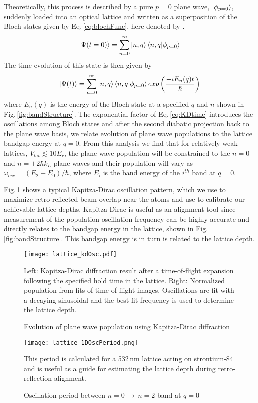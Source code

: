 Theoretically, this process is described by a pure $p=0$ plane wave, $\left| {\phi_{p=0}} \right>$, suddenly loaded into an optical lattice and written as a superposition of the Bloch states given by Eq.\,\ref{eq:blochFunc}, here denoted by .
	\begin{equation} \label{eq:p0inBloch}
		\left| {\Psi(t=0)} \right> = \sum_{n=0}^{\infty} \left| {n,q} \right> \left< {n,q} | {\phi_{p=0}} \right>
	\end{equation}
The time evolution of this state is then given by
	\begin{equation} \label{eq:KDtime}
		\left| {\Psi(t)} \right> = \sum_{n=0}^{\infty} \left| {n,q} \right> \left< {n,q} | {\phi_{p=0}} \right> exp \left( \frac{-i E_n(q) t}{\hbar} \right)
	\end{equation}
where $E_n(q)$ is the energy of the Bloch state at a specified $q$ and $n$ shown in Fig.\,\ref{fig:bandStructure}.
The exponential factor of Eq.\,\ref{eq:KDtime} introduces the oscillations among Bloch states and after the second diabatic projection back to the plane wave basis, we relate evolution of plane wave populations to the lattice bandgap energy at $q=0$.
From this analysis we find that for relatively weak lattices, $V_{lat} \lesssim 10 E_r$, the plane wave population will be constrained to the $n=0$ and $n = \pm 2 \hbar k_L$ plane waves and their population will vary as $\omega_{osc} = (E_2 - E_0) / \hbar$, where $E_i$ is the band energy of the $i^{th}$ band at $q=0$.

Fig.\,\ref{fig:KDoscillations} shows a typical Kapitza-Dirac oscillation pattern, which we use to maximize retro-reflected beam overlap near the atoms and use to calibrate our achievable lattice depths. 
Kapitza-Dirac is useful as an alignment tool since measurement of the population oscillation frequency can be highly accurate and directly relates to the bandgap energy in the lattice, shown in Fig.\,\ref{fig:bandStructure}.
This bandgap energy is in turn is related to the lattice depth.
	\begin{figure}
		\texttt{[image: lattice\_kdOsc.pdf]}
		\caption{Evolution of plane wave population using Kapitza-Dirac diffraction}{Left: Kapitza-Dirac diffraction result after a time-of-flight expansion following the specified hold time in the lattice. Right: Normalized population from fits of time-of-flight images. Oscillations are fit with a decaying sinusoidal and the best-fit frequency is used to determine the lattice depth.}
		 \label{fig:KDoscillations}
	\end{figure}
	
	\begin{figure}
		\centerline{
		\texttt{[image: lattice\_1DOscPeriod.png]}}
		\caption{Oscillation period between $n=0\,\rightarrow\,n=2$ band at $q=0$}{This period is calculated for a 532\,nm lattice acting on strontium-84 and is useful as a guide for estimating the lattice depth during retro-reflection alignment.}
		\label{fig:latOscPeriod}
	\end{figure} 


